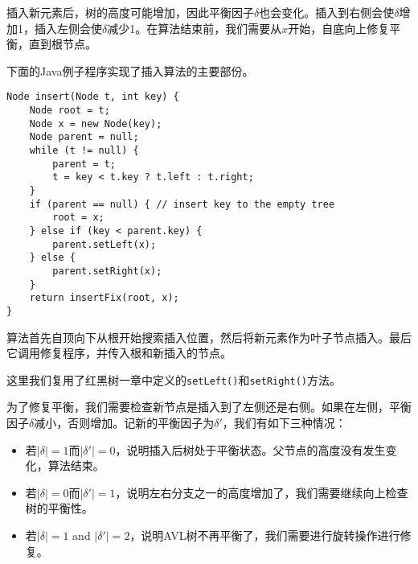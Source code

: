 \documentclass[UTF8]{article}
\begin{document}
插入新元素后，树的高度可能增加，因此平衡因子$\delta$也会变化。插入到右侧会使$\delta$增加1，插入左侧会使$\delta$减少1。在算法结束前，我们需要从$x$开始，自底向上修复平衡，直到根节点。

下面的Java例子程序实现了插入算法的主要部份。

\lstset{language=Java}
\begin{lstlisting}
Node insert(Node t, int key) {
    Node root = t;
    Node x = new Node(key);
    Node parent = null;
    while (t != null) {
        parent = t;
        t = key < t.key ? t.left : t.right;
    }
    if (parent == null) { // insert key to the empty tree
        root = x;
    } else if (key < parent.key) {
        parent.setLeft(x);
    } else {
        parent.setRight(x);
    }
    return insertFix(root, x);
}
\end{lstlisting}

算法首先自顶向下从根开始搜索插入位置，然后将新元素作为叶子节点插入。最后它调用修复程序，并传入根和新插入的节点。

这里我们复用了红黑树一章中定义的\texttt{setLeft()}和\texttt{setRight()}方法。

为了修复平衡，我们需要检查新节点是插入到了左侧还是右侧。如果在左侧，平衡因子$\delta$减小，否则增加。记新的平衡因子为$\delta'$，我们有如下三种情况：

\begin{itemize}
\item 若$|\delta| = 1$而$|\delta'| = 0$，说明插入后树处于平衡状态。父节点的高度没有发生变化，算法结束。

\item 若$|\delta| = 0$而$|\delta'| = 1$，说明左右分支之一的高度增加了，我们需要继续向上检查树的平衡性。

\item 若$|\delta| = 1$ and $|\delta'| = 2$，说明AVL树不再平衡了，我们需要进行旋转操作进行修复。
\end{itemize}
\end{document}

